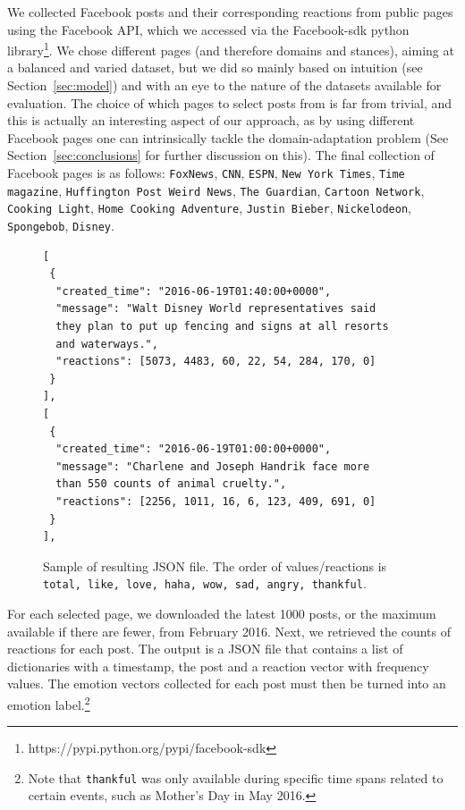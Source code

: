 \documentclass[11pt]{article}
\begin{document}
We collected Facebook posts and their corresponding reactions from public pages using the Facebook API, which we accessed via the Facebook-sdk python library\footnote{https://pypi.python.org/pypi/facebook-sdk}. We chose different pages (and therefore domains and stances), aiming at a balanced and varied dataset, but we did so mainly based on intuition (see Section~\ref{sec:model}) and with an eye to the nature of the datasets available for evaluation. The choice of which pages to select posts from is far from trivial, and this is actually an interesting aspect of our approach, as by using different Facebook pages one can intrinsically tackle the domain-adaptation problem (See Section~\ref{sec:conclusions} for further discussion on this). The final collection of Facebook pages is as follows: 
\texttt{FoxNews}, 
\texttt{CNN}, 
\texttt{ESPN}, 
\texttt{New York Times}, 
\texttt{Time magazine},
\texttt{Huffington Post Weird News}, 
\texttt{The Guardian}, 
\texttt{Cartoon Network}, 
\texttt{Cooking Light}, 
\texttt{Home Cooking Adventure}, 
\texttt{Justin Bieber}, 
\texttt{Nickelodeon}, 
\texttt{Spongebob}, 
\texttt{Disney}.



\begin{figure}
\begin{Verbatim}[fontsize=\scriptsize]
[
 {
  "created_time": "2016-06-19T01:40:00+0000",
  "message": "Walt Disney World representatives said 
  they plan to put up fencing and signs at all resorts 
  and waterways.",
  "reactions": [5073, 4483, 60, 22, 54, 284, 170, 0]
 }
],
[
 {
  "created_time": "2016-06-19T01:00:00+0000",
  "message": "Charlene and Joseph Handrik face more
  than 550 counts of animal cruelty.",
  "reactions": [2256, 1011, 16, 6, 123, 409, 691, 0]
 }
],
\end{Verbatim}
\caption{Sample of resulting JSON file\label{fig:json}. The order of values/reactions is \texttt{total, like, love, haha, wow, sad, angry, thankful}.}
\end{figure}


For each selected page, we downloaded the latest 1000 posts, or the maximum available if there are fewer, from February 2016.
Next, we retrieved the counts of reactions for each post. The output is a JSON file that contains a list of dictionaries with a timestamp, the post and a reaction vector with frequency values. The emotion vectors collected for each post must then be turned into an emotion label.\footnote{Note that \texttt{thankful} was only available during specific time spans related to certain events, such as Mother's Day in May 2016.}
\end{document}
